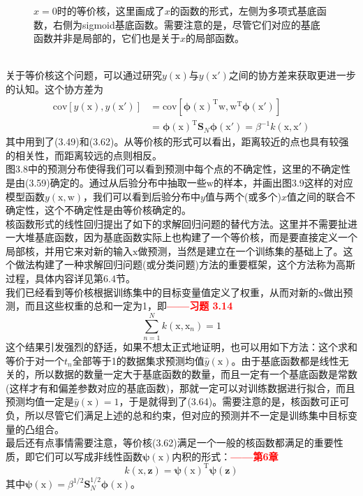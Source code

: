 \documentclass[b5paper]{book}
\numberwithin{equation}{chapter}
\newcommand {\bx} {\boldsymbol{\mathrm{x}}}
\newcommand {\bw} {\boldsymbol{\mathrm{w}}}
\newcommand {\rmT} {\mathrm{T}}
\newcommand {\bfphi} {\boldsymbol{\phi}}
\begin{document}
{\begin{figure}[ht]
\begin{minipage}[t]{0.5\linewidth}
		\label{fig:3-11b}
		\end{minipage}
		\caption{$x=0$时的等价核，这里画成了$x$的函数的形式，左侧为多项式基底函数，右侧为sigmoid基底函数。需要注意的是，尽管它们对应的基底函数并非是局部的，它们也是关于$x$的局部函数。}
	\end{figure}
	\\
	\indent 关于等价核这个问题，可以通过研究$y(\bx)$与$y(\bx')$之间的协方差来获取更进一步的认知。这个协方差为
	\begin{equation}
	\begin{split}
		\mathrm{cov} [y(\bx),y(\bx')] &= \mathrm{cov}\left[\bfphi(\bx)^{\rmT} \bw, \bw^{\rmT}\bfphi(\bx')\right]\\
		&= \bfphi(\bx)^{\rmT}\mathbf{S}_N\bfphi(\bx') = \beta^{-1}k(\bx,\bx')
	\end{split}
	\end{equation}
	其中用到了(3.49)和(3.62)。从等价核的形式可以看出，距离较近的点也具有较强的相关性，而距离较远的点则相反。\\
	\indent 图3.8中的预测分布使得我们可以看到预测中每个点的不确定性，这里的不确定性是由(3.59)确定的。通过从后验分布中抽取一些$\bw$的样本，并画出图3.9这样的对应模型函数$y(\bx,\bw)$，我们可以看到后验分布中$y$值与两个(或多个)$x$值之间的联合不确定性，这个不确定性是由等价核确定的。\\
	\indent 核函数形式的线性回归提出了如下的求解回归问题的替代方法。这里并不需要扯进一大堆基底函数，因为基底函数实际上也构建了一个等价核，而是要直接定义一个局部核，并用它来对新的输入$\bx$做预测，当然是建立在一个训练集的基础上了。这个做法构建了一种求解回归问题(或分类问题)方法的重要框架，这个方法称为高斯过程，具体内容详见第6.4节。\\
	\indent 我们已经看到等价核根据训练集中的目标变量值定义了权重，从而对新的$\bx$做出预测，而且这些权重的总和一定为1，即\textcolor{red}{\textbf{——习题 3.14}}
	\begin{equation}
		\sum_{n=1}^N k(\bx,\bx_n) = 1
	\end{equation}
	这个结果引发强烈的舒适，如果不想太正式地证明，也可以用如下方法：这个求和等价于对一个$t_n$全部等于1的数据集求预测均值$\hat{y}(\bx)$。由于基底函数都是线性无关的，所以数据的数量一定大于基底函数的数量，而且一定有一个基底函数是常数(这样才有和偏差参数对应的基底函数)，那就一定可以对训练数据进行拟合，而且预测均值一定是$\hat{y}(\bx)=1$，于是就得到了(3.64)。需要注意的是，核函数可正可负，所以尽管它们满足上述的总和约束，但对应的预测并不一定是训练集中目标变量的凸组合。\\
	\indent 最后还有点事情需要注意，等价核(3.62)满足一个一般的核函数都满足的重要性质，即它们可以写成非线性函数$\boldsymbol{\psi}(\bx)$内积的形式：\textcolor{red}{\textbf{——第6章}}
	\begin{equation}
		k(\bx,\mathbf{z}) = \boldsymbol{\psi}(\bx)^{\rmT} \boldsymbol{\psi}(\mathbf{z})
	\end{equation}
	其中$\boldsymbol{\psi}(\bx)=\beta^{1/2}\mathbf{S}_N^{1/2}\bfphi(\bx)$。
	}
\end{document}
